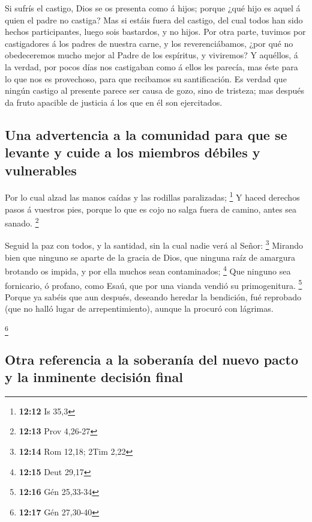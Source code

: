  Si sufrís el castigo, Dios se os presenta como á hijos;
porque ¿qué hijo es aquel á quien el padre no castiga? 
Mas si estáis fuera del castigo, del cual todos han sido hechos
participantes, luego sois bastardos, y no hijos.  Por otra
parte, tuvimos por castigadores á los padres de nuestra carne, y los
reverenciábamos, ¿por qué no obedeceremos mucho mejor al Padre de los
espíritus, y viviremos?  Y aquéllos, á la verdad, por
pocos días nos castigaban como á ellos les parecía, mas éste para lo que
nos es provechoso, para que recibamos su santificación. 
Es verdad que ningún castigo al presente parece ser causa de gozo, sino
de tristeza; mas después da fruto apacible de justicia á los que en él
son ejercitados.

\hypertarget{una-advertencia-a-la-comunidad-para-que-se-levante-y-cuide-a-los-miembros-duxe9biles-y-vulnerables}{%
\subsection{Una advertencia a la comunidad para que se levante y cuide a
los miembros débiles y
vulnerables}\label{una-advertencia-a-la-comunidad-para-que-se-levante-y-cuide-a-los-miembros-duxe9biles-y-vulnerables}}

 Por lo cual alzad las manos caídas y las rodillas
paralizadas; \footnote{\textbf{12:12} Is 35,3}  Y haced
derechos pasos á vuestros pies, porque lo que es cojo no salga fuera de
camino, antes sea sanado. \footnote{\textbf{12:13} Prov 4,26-27}

 Seguid la paz con todos, y la santidad, sin la cual
nadie verá al Señor: \footnote{\textbf{12:14} Rom 12,18; 2Tim 2,22}
 Mirando bien que ninguno se aparte de la gracia de Dios,
que ninguna raíz de amargura brotando os impida, y por ella muchos sean
contaminados; \footnote{\textbf{12:15} Deut 29,17}  Que
ninguno sea fornicario, ó profano, como Esaú, que por una vianda vendió
su primogenitura. \footnote{\textbf{12:16} Gén 25,33-34} 
Porque ya sabéis que aun después, deseando heredar la bendición, fué
reprobado (que no halló lugar de arrepentimiento), aunque la procuró con
lágrimas.

\footnote{\textbf{12:17} Gén 27,30-40}

\hypertarget{otra-referencia-a-la-soberanuxeda-del-nuevo-pacto-y-la-inminente-decisiuxf3n-final}{%
\subsection{Otra referencia a la soberanía del nuevo pacto y la
inminente decisión
final}\label{otra-referencia-a-la-soberanuxeda-del-nuevo-pacto-y-la-inminente-decisiuxf3n-final}}

